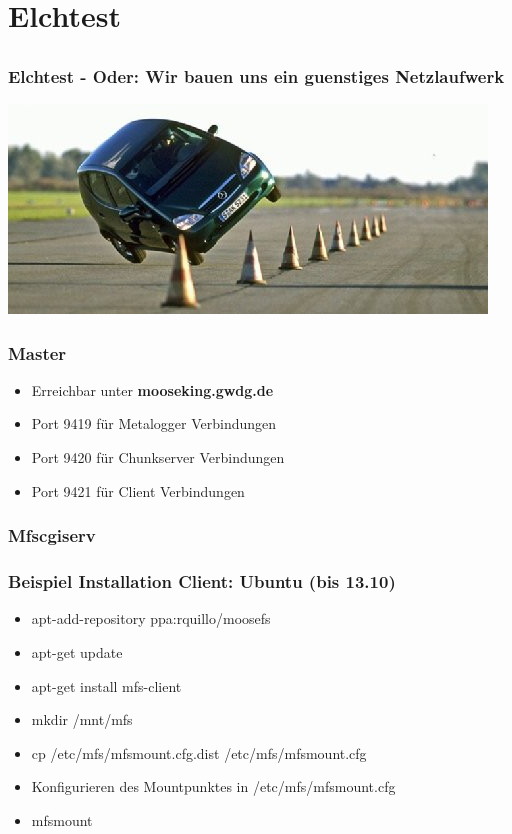 \documentclass{beamer}
\begin{document}
\section{Elchtest}
\subsection*{}

\begin{frame}
	\frametitle{Elchtest - Oder: Wir bauen uns ein guenstiges Netzlaufwerk}
	\centering
	\includegraphics[scale=0.5]{elchtest.jpg}	
\end{frame}

\begin{frame}
	\frametitle{Master}
	\begin{itemize}
	\item	Erreichbar unter \textbf{mooseking.gwdg.de}	
	\item 	Port 9419 f\"ur Metalogger Verbindungen
	\item	Port 9420 f\"ur Chunkserver Verbindungen
	\item	Port 9421 f\"ur Client Verbindungen
	\end{itemize}
\end{frame}
	

\begin{frame}
	\frametitle{Mfscgiserv}
\end{frame}

\begin{frame}
	\frametitle{Beispiel Installation Client: Ubuntu (bis 13.10)}
	\begin{itemize}
		\item apt-add-repository ppa:rquillo/moosefs
		\item apt-get update
		\item apt-get install mfs-client
		\item mkdir /mnt/mfs 
		\item cp /etc/mfs/mfsmount.cfg.dist /etc/mfs/mfsmount.cfg
		\item Konfigurieren des Mountpunktes in /etc/mfs/mfsmount.cfg
		\item mfsmount
	\end{itemize}
\end{frame}
\end{document}
